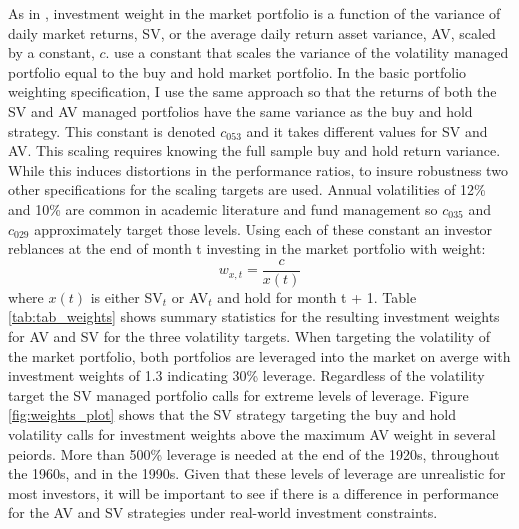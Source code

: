 As in \citet{moreira_volatility-managed_2017}, investment weight in the market portfolio is a function of the variance of daily market returns, SV, or the average daily return asset variance, AV, scaled by a constant, $c$. \citet{moreira_volatility-managed_2017} use a constant that scales the variance of the volatility managed portfolio equal to the buy and hold market portfolio. In the basic portfolio weighting specification, I use the same approach so that the returns of both the SV and AV managed portfolios have the same variance as the buy and hold strategy. This constant is denoted $c_{053}$ and it takes different values for SV and AV. This scaling requires knowing the full sample buy and hold return variance. While this induces distortions in the performance ratios, to insure robustness two other specifications for the scaling targets are used. Annual volatilities of 12\% and 10\% are common in academic literature and fund management so $c_{035}$ and $c_{029}$ approximately target those levels. \citet{barroso_momentum_2015,morrison_guarantees_nodate,verma_volatility-targeting_2018,fleming_economic_nodate,hocquard_constant-volatility_2013} Using each of these constant an investor reblances at the end of month t investing in the market portfolio with weight:
\begin{equation}
	w_{x,t} = \frac{c}{x(t)}
\end{equation} where $x(t)$ is either SV$_{t}$ or AV$_{t}$ and hold for month t + 1. Table \ref{tab:tab_weights} shows summary statistics for the resulting investment weights for AV and SV for the three volatility targets. When targeting the volatility of the market portfolio, both portfolios are leveraged into the market on averge with investment weights of 1.3 indicating 30\% leverage. Regardless of the volatility target the SV managed portfolio calls for extreme levels of leverage. Figure \ref{fig:weights_plot} shows that the SV strategy targeting the buy and hold volatility calls for investment weights above the maximum AV weight in several peiords. More than 500\% leverage is needed at the end of the 1920s, throughout the 1960s, and in the 1990s. Given that these levels of leverage are unrealistic for most investors, it will be important to see if there is a difference in performance for the AV and SV strategies under real-world investment constraints.

